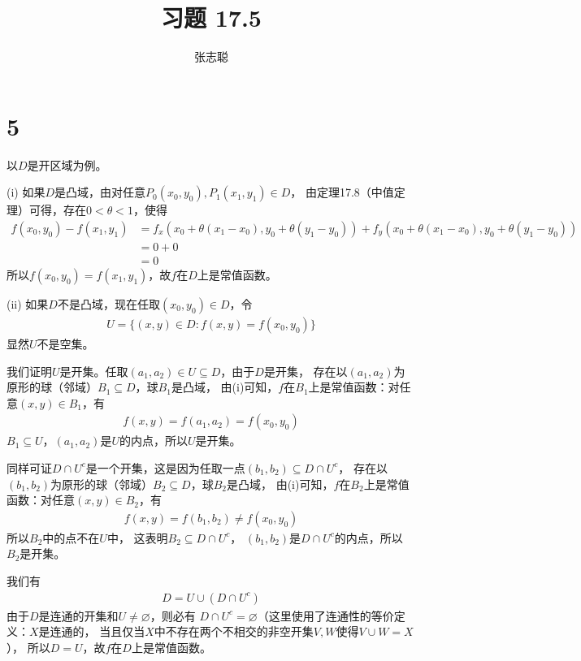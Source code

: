 \documentclass{article}
\begin{document}
\title{习题 17.5}
\author{张志聪}
\maketitle

\section*{5}
以$D$是开区域为例。

(i) 如果$D$是凸域，由对任意$P_0(x_0, y_0), P_1(x_1, y_1) \in D$，
由定理17.8（中值定理）可得，存在$0 < \theta < 1$，使得
\begin{align*}
  f(x_0, y_0) - f(x_1, y_1)
   & = f_x(x_0 + \theta(x_1 - x_0), y_0 + \theta(y_1 - y_0)) + f_y(x_0 + \theta(x_1 - x_0), y_0 + \theta(y_1 - y_0)) \\
   & = 0 + 0                                                                                                         \\
   & = 0
\end{align*}
所以$f(x_0, y_0) = f(x_1, y_1)$，故$f$在$D$上是常值函数。

(ii) 如果$D$不是凸域，现在任取$(x_0, y_0) \in D$，令
\begin{align*}
  U = \{(x, y) \in D : f(x, y) = f(x_0, y_0) \}
\end{align*}
显然$U$不是空集。

我们证明$U$是开集。任取$(a_1, a_2) \in U \subseteq D$，由于$D$是开集，
存在以$(a_1, a_2)$为原形的球（邻域）$B_1 \subseteq D$，球$B_1$是凸域，
由(i)可知，$f$在$B_1$上是常值函数：对任意$(x, y) \in B_1$，有
\begin{align*}
  f(x, y) = f(a_1, a_2) = f(x_0, y_0)
\end{align*}
$B_1 \subseteq U$，$(a_1, a_2)$是$U$的内点，所以$U$是开集。

同样可证$D \cap U^c$是一个开集，这是因为任取一点$(b_1, b_2) \subseteq D \cap U^c$，
存在以$(b_1, b_2)$为原形的球（邻域）$B_2 \subseteq D$，球$B_2$是凸域，
由(i)可知，$f$在$B_2$上是常值函数：对任意$(x, y) \in B_2$，有
\begin{align*}
  f(x, y) = f(b_1, b_2) \neq f(x_0, y_0)
\end{align*}
所以$B_2$中的点不在$U$中，
这表明$B_2 \subseteq D \cap U^c$，
$(b_1, b_2)$是$D \cap U^c$的内点，所以$B_2$是开集。

我们有
\begin{align*}
 D = U \cup (D \cap U^c) 
\end{align*}
由于$D$是连通的开集和$U \neq \varnothing$，则必有
$D \cap U^c = \varnothing$（这里使用了连通性的等价定义：$X$是连通的，
当且仅当$X$中不存在两个不相交的非空开集$V, W$使得$V \cup W = X$），
所以$D = U$，故$f$在$D$上是常值函数。
\end{document}
